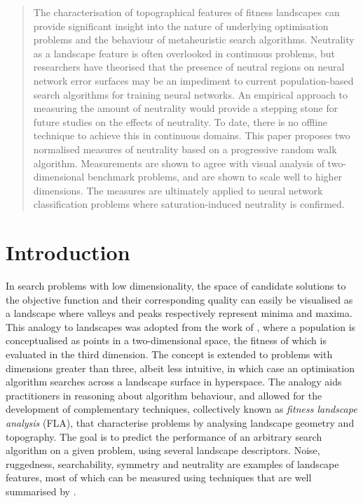 \documentclass[conference]{IEEEtran}
\begin{document}
\begin{abstract}
The characterisation of topographical features of fitness landscapes can provide significant insight into the nature of underlying optimisation problems and the behaviour of metaheuristic search algorithms. Neutrality as a landscape feature is often overlooked in continuous problems, but researchers have theorised that the presence of neutral regions on neural network error surfaces may be an impediment to current population-based search algorithms for training neural networks. An empirical approach to measuring the amount of neutrality would provide a stepping stone for future studies on the effects of neutrality. To date, there is no offline technique to achieve this in continuous domains. This paper proposes two normalised measures of neutrality based on a progressive random walk algorithm. Measurements are shown to agree with visual analysis of two-dimensional benchmark problems, and are shown to scale well to higher dimensions. The measures are ultimately applied to neural network classification problems where saturation-induced neutrality is confirmed.
\end{abstract}

\section{Introduction}
\label{intro}
In search problems with low dimensionality, the space of candidate solutions to the objective function and their corresponding quality can easily be visualised as a landscape where valleys and peaks respectively represent minima and maxima. This analogy to landscapes was adopted from the work of \citet{wright1932roles}, where a population is conceptualised as points in a two-dimensional space, the fitness of which is evaluated in the third dimension. The concept is extended to problems with dimensions greater than three, albeit less intuitive, in which case an optimisation algorithm searches across a landscape surface in hyperspace. The analogy aids practitioners in reasoning about algorithm behaviour, and allowed for the development of complementary techniques, collectively known as \textit{fitness landscape analysis} (FLA), that characterise problems by analysing landscape geometry and topography. The goal is to predict the performance of an arbitrary search algorithm on a given problem, using several landscape descriptors. Noise, ruggedness, searchability, symmetry and neutrality are examples of landscape features, most of which can be measured using techniques that are well summarised by \citet{malan2013survey}. 
\end{document}
